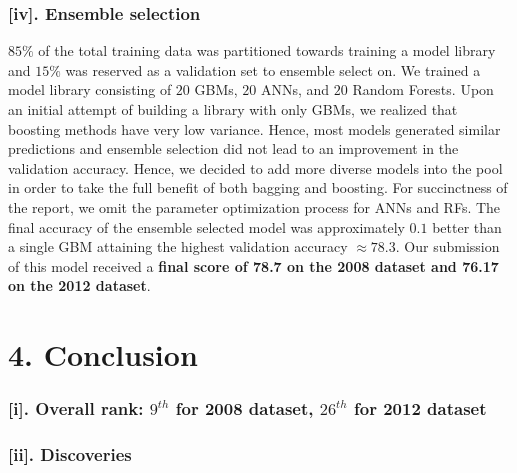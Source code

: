 \subsubsection*{[iv]. Ensemble selection}
$85\%$ of the total training data was partitioned towards training a model library and $15\%$ was reserved as a validation set to ensemble select on. We trained a model library consisting of $20$ GBMs, $20$ ANNs, and $20$ Random Forests. Upon an initial attempt of building a library with only GBMs, we realized that boosting methods have very low variance. Hence, most models generated similar predictions and ensemble selection did not lead to an improvement in the validation accuracy. Hence, we decided to add more diverse models into the pool in order to take the full benefit of both bagging and boosting. For succinctness of the report, we omit the parameter optimization process for ANNs and RFs. The final accuracy of the ensemble selected model was approximately $0.1$ better than a single GBM attaining the highest validation accuracy $\approx 78.3$. Our submission of this model received a \textbf{final score of 78.7 on the 2008 dataset and 76.17 on the 2012 dataset}. 

\newpage

\section*{4. Conclusion}
\subsubsection*{[i]. Overall rank: $9^{th}$ for 2008 dataset, $26^{th}$ for 2012 dataset}
\subsubsection*{[ii]. Discoveries}


